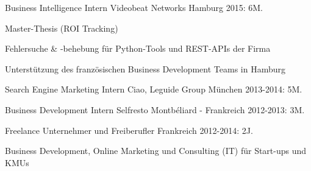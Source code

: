 \begin{cventries}
	\cventry
		{Business Intelligence Intern} %
		{Videobeat Networks} %
		{Hamburg} %
		{2015: 6M.} %
		{
		\begin{cvitems} %
			\item {Master-Thesis (ROI Tracking)}
			\item {Fehlersuche \& -behebung für Python-Tools und REST-APIs der Firma}
			\item {Unterstützung des französischen Business Development Teams in Hamburg}
		\end{cvitems}
		}

	\cventry
		{Search Engine Marketing Intern} %
		{Ciao, Leguide Group} %
		{München} %
		{2013-2014: 5M.} %
		{
		}

	\cventry
		{Business Development Intern} %
		{Selfresto} %
		{Montbéliard - Frankreich} %
		{2012-2013: 3M.} %
		{
		}

	\cventry
		{Freelance} %
		{Unternehmer und Freiberufler} %
		{Frankreich} %
		{2012-2014: 2J.} %
		{	
		\begin{cvitems} %
			\item{Business Development, Online Marketing und Consulting (IT) für Start-ups und KMUs}
		\end{cvitems}
		}
\end{cventries}
